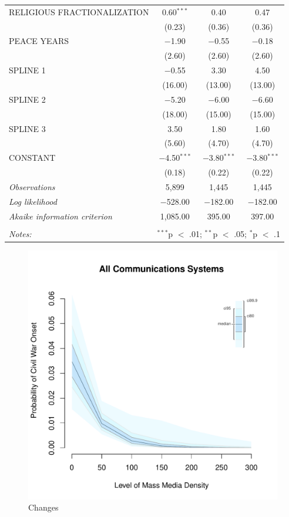 \documentclass[11pt,article,oneside]{memoir}
\makeatletter
\def\maxwidth{\ifdim\Gin@nat@width>\linewidth\linewidth
\else\Gin@nat@width\fi}
\let\Oldincludegraphics\includegraphics
\renewcommand{\includegraphics}[1]{\Oldincludegraphics[width=\maxwidth]{#1}}
\makeatother
\begin{document}
\begin{table}[!htbp]
\begin{tabular}{@{\extracolsep{5pt}}lccc}
  RELIGIOUS FRACTIONALIZATION & 0.60$^{***}$ & 0.40 & 0.47 \\ 
  & (0.23) & (0.36) & (0.36) \\ 
  PEACE YEARS & $-$1.90 & $-$0.55 & $-$0.18 \\ 
  & (2.60) & (2.60) & (2.60) \\ 
  SPLINE 1 & $-$0.55 & 3.30 & 4.50 \\ 
  & (16.00) & (13.00) & (13.00) \\ 
  SPLINE 2 & $-$5.20 & $-$6.00 & $-$6.60 \\ 
  & (18.00) & (15.00) & (15.00) \\ 
  SPLINE 3 & 3.50 & 1.80 & 1.60 \\ 
  & (5.60) & (4.70) & (4.70) \\ 
  CONSTANT & $-$4.50$^{***}$ & $-$3.80$^{***}$ & $-$3.80$^{***}$ \\ 
  & (0.18) & (0.22) & (0.22) \\ 
 \textit{Observations} & 5,899 & 1,445 & 1,445 \\ 
\textit{Log likelihood} & $-$528.00 & $-$182.00 & $-$182.00 \\ 
\textit{Akaike information criterion} & 1,085.00 & 395.00 & 397.00 \\ 
\hline \\[-1.8ex] 
\textit{Notes:} & \multicolumn{3}{l}{$^{***}$p $<$ .01; $^{**}$p $<$ .05; $^{*}$p $<$ .1} \\ 
\end{tabular} 
\end{table}

\clearpage

\begin{figure} 
\includegraphics{figure/mdi_effect.pdf} 
\caption{Changes} 
\label{myFigur} 
\end{figure}
\end{document}
